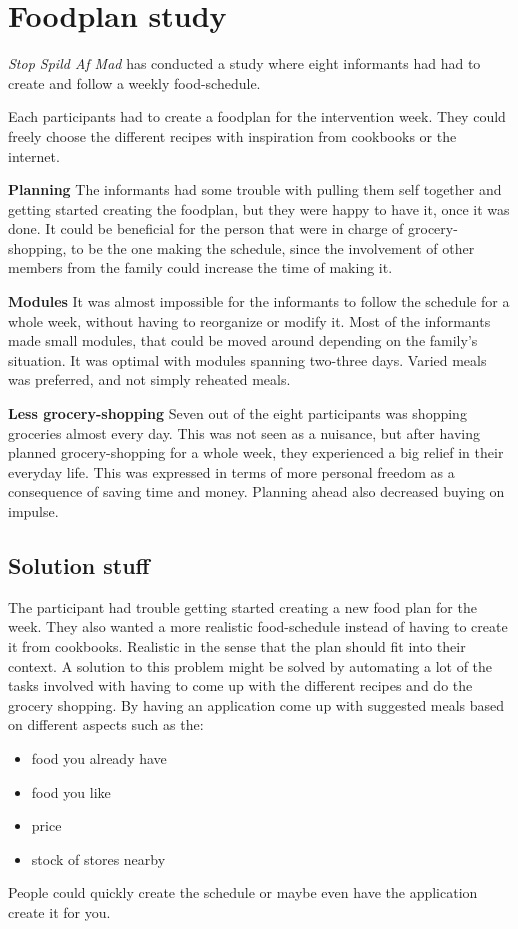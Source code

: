 \section{Foodplan study}
\textit{Stop Spild Af Mad}\cite{madSpild_RapportAdfaerd} has conducted a study where eight informants had had to create and follow a weekly food-schedule.

Each participants had to create a foodplan for the intervention week. They could freely choose the different recipes with inspiration from cookbooks or the internet.

\textbf{Planning}
The informants had some trouble with pulling them self together and getting started creating the foodplan, but they were happy to have it, once it was done. It could be beneficial for the person that were in charge of grocery-shopping, to be the one making the schedule, since the involvement of other members from the family could increase the time of making it.

\textbf{Modules}
It was almost impossible for the informants to follow the schedule for a whole week, without having to reorganize or modify it. Most of the informants made small modules, that could be moved around depending on the family's situation. It was optimal with modules spanning two-three days. Varied meals was preferred, and not simply reheated meals.

\textbf{Less grocery-shopping}
Seven out of the eight participants was shopping groceries almost every day. This was not seen as a nuisance, but after having planned grocery-shopping for a whole week, they experienced a big relief in their everyday life. This was expressed in terms of more personal freedom as a consequence of saving time and money. Planning ahead also decreased buying on impulse.

\subsection{Solution stuff} 
The participant had trouble getting started creating a new food plan for the week. They also wanted a more realistic food-schedule instead of having to create it from cookbooks. Realistic in the sense that the plan should fit into their context. A solution to this problem might be solved by automating a lot of the tasks involved with having to come up with the different recipes and do the grocery shopping.
By having an application come up with suggested meals based on different aspects such as the:
\begin{itemize}
\item food you already have
\item food you like
\item price
\item stock of stores nearby
\end{itemize}
People could quickly create the schedule or maybe even have the application create it for you.